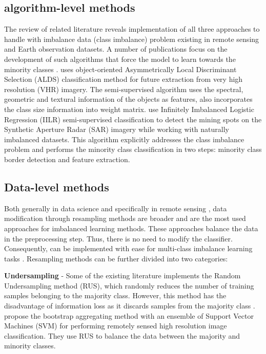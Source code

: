 \documentclass[parskip=full]{scrartcl}
\begin{document}
\subsection{algorithm-level methods}
The review of related literature reveals implementation of all three approaches
to handle with imbalance data (class imbalance) problem existing in remote
sensing and Earth observation datasets. A number of publications focus on the
development of such algorithms that force the model to learn towards the
minority classes \cite{Wang2019, Chen2010, Williams2009, Ji2018}.
\cite{Chen2010} uses object-oriented Asymmetrically Local Discriminant
Selection (ALDS) classification method for future extraction from very high
resolution (VHR) imagery. The semi-supervised algorithm uses the spectral,
geometric and textural information of the objects as features, also
incorporates the class size information into weight matrix. \cite{Williams2009}
use Infinitely Imbalanced Logistic Regression (IILR) semi-supervised
classification to detect the mining spots on the Synthetic Aperture Radar (SAR)
imagery while working with naturally imbalanced datasets. This algorithm
explicitly addresses the class imbalance problem and performs the minority
class classification in two steps: minority class border detection and
feature extraction.

\subsection{Data-level methods}
Both generally in data science \cite{Douzas2019} and specifically in
remote sensing \cite{Feng2019}, data modification through resampling methods
are broader and are the most used approaches for imbalanced learning methods.
These approaches balance the data in the preprocessing step. Thus, there is
no need to modify the classifier. Consequently, can be implemented with ease
for multi-class imbalance learning tasks \cite{Feng2019}. Resampling methods
can be further divided into two categories:

\textbf{Undersampling} - Some of the existing literature implements the Random
Undersampling method (RUS), which randomly reduces the number of training
samples belonging to the majority class. However, this method has the
disadvantage of information loss as it discards samples from the majority class
\cite{Feng2019}. \cite{Waske2009} propose the bootstrap aggregating method with
an ensemble of Support Vector Machines (SVM) for performing remotely sensed
high resolution image classification. They use RUS to balance the data between
the majority and minority classes.
\end{document}
